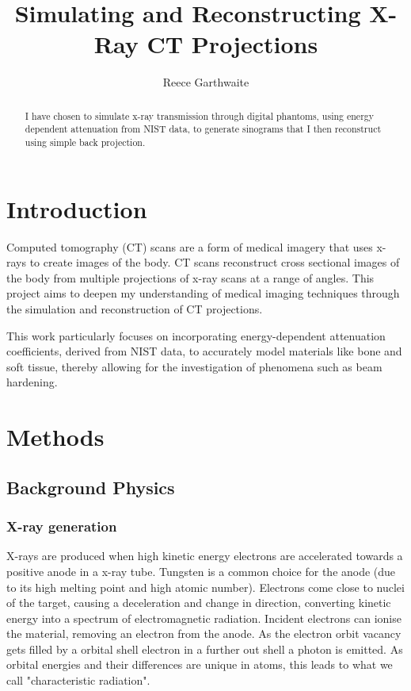 \documentclass{article}
\title{Simulating and Reconstructing X-Ray CT Projections}
\author{Reece Garthwaite}
\date{}
\begin{document}
\maketitle

\begin{abstract}
I have chosen to simulate x-ray transmission through digital phantoms, using energy dependent attenuation from NIST data, to generate sinograms that I then reconstruct using simple back projection.
\end{abstract}

\section{Introduction}
Computed tomography (CT) scans are a form of medical imagery that uses x-rays to  create images of the body. CT scans reconstruct cross sectional images of the body from multiple projections of x-ray scans at a range of angles. This project aims to deepen my understanding of medical imaging techniques through the simulation and reconstruction of CT projections. 

This work particularly focuses on incorporating energy-dependent attenuation coefficients, derived from NIST data, to accurately model materials like bone and soft tissue, thereby allowing for the investigation of phenomena such as beam hardening.

\section{Methods}

\subsection{Background Physics}
\subsubsection{X-ray generation}
X-rays are produced when high kinetic energy electrons are accelerated towards a positive anode in a x-ray tube. Tungsten is a common choice for the anode (due to its high melting point and high atomic number). Electrons come close to nuclei of the target, causing a deceleration and change in direction, converting kinetic energy into a spectrum of electromagnetic radiation. Incident electrons can ionise the material, removing an electron from the anode. As the electron orbit vacancy gets filled by a orbital shell electron in a further out shell a photon is emitted. As orbital energies and their differences are unique in atoms, this leads to what we call "characteristic radiation".
\cite{Tafti}
\end{document}
